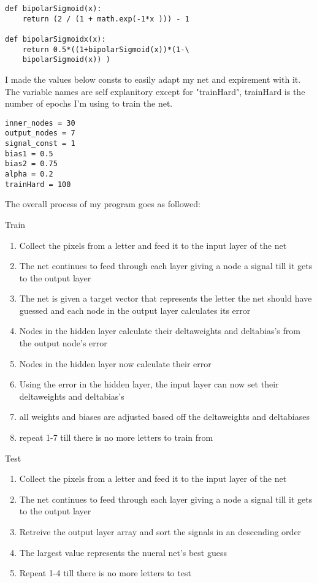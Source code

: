 \documentclass[letterpaper]{article}
\begin{document}
\begin{lstlisting}
def bipolarSigmoid(x):
    return (2 / (1 + math.exp(-1*x ))) - 1

def bipolarSigmoidx(x):
    return 0.5*((1+bipolarSigmoid(x))*(1-\
	bipolarSigmoid(x)) )
\end{lstlisting}
I made the values below consts to easily adapt my net and expirement with it. The variable names are self explanitory except for "trainHard", trainHard is the number of epochs I'm using to train the net.
\begin{lstlisting}
inner_nodes = 30
output_nodes = 7
signal_const = 1
bias1 = 0.5
bias2 = 0.75
alpha = 0.2
trainHard = 100
\end{lstlisting}
The overall process of my program goes as followed:

Train
\begin{enumerate}
\item Collect the pixels from a letter and feed it to the input layer of the net
\item The net continues to feed through each layer giving a node a signal till it gets to the output layer
\item The net is given a target vector that represents the letter the net should have guessed and each node in the output layer calculates its error
\item Nodes in the hidden layer calculate their deltaweights and deltabias's from the output node's error 
\item Nodes in the hidden layer now calculate their error
\item Using the error in the hidden layer, the input layer can now set their deltaweights and deltabias's
\item all weights and biases are adjusted based off the deltaweights and deltabiases
\item repeat 1-7 till there is no more letters to train from  
\end{enumerate}
Test
\begin{enumerate}
\item Collect the pixels from a letter and feed it to the input layer of the net
\item The net continues to feed through each layer giving a node a signal till it gets to the output layer
\item Retreive the output layer array and sort the signals in an descending order 
\item The largest value represents the nueral net's best guess
\item Repeat 1-4 till there is no more letters to test
\end{enumerate}
\end{document}
